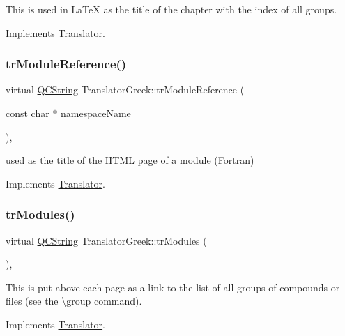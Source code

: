 This is used in La\+TeX as the title of the chapter with the index of all groups. 

Implements \mbox{\hyperlink{class_translator}{Translator}}.

\mbox{\label{class_translator_greek_aa1e3b8337ab7f6309b043255daa854ec}} 
\subsubsection{\texorpdfstring{trModuleReference()}{trModuleReference()}}
{\footnotesize\ttfamily virtual \mbox{\hyperlink{class_q_c_string}{Q\+C\+String}} Translator\+Greek\+::tr\+Module\+Reference (\begin{DoxyParamCaption}\item[{const char $\ast$}]{namespace\+Name }\end{DoxyParamCaption})\hspace{0.3cm}{\ttfamily [inline]}, {\ttfamily [virtual]}}

used as the title of the H\+T\+ML page of a module (Fortran) 

Implements \mbox{\hyperlink{class_translator}{Translator}}.

\mbox{\label{class_translator_greek_a2176cdc8c9af22c9b1f996ff482e994b}} 
\subsubsection{\texorpdfstring{trModules()}{trModules()}}
{\footnotesize\ttfamily virtual \mbox{\hyperlink{class_q_c_string}{Q\+C\+String}} Translator\+Greek\+::tr\+Modules (\begin{DoxyParamCaption}{ }\end{DoxyParamCaption})\hspace{0.3cm}{\ttfamily [inline]}, {\ttfamily [virtual]}}

This is put above each page as a link to the list of all groups of compounds or files (see the \textbackslash{}group command). 

Implements \mbox{\hyperlink{class_translator}{Translator}}.

\mbox{\label{class_translator_greek_a48ca418b3d81aa9616e661a8e111a1fc}} 

